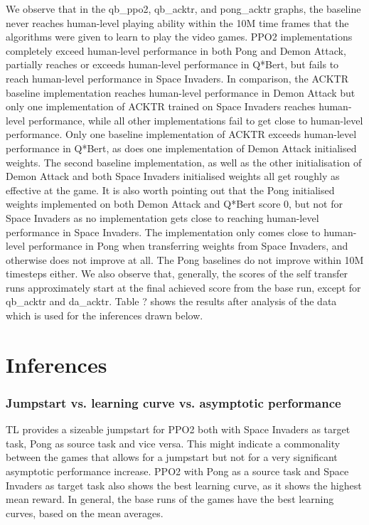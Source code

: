 We observe that in the qb\_ppo2, qb\_acktr, and pong\_acktr graphs, the baseline never reaches human-level playing ability within the 10M time frames that the algorithms were given to learn to play the video games. 
PPO2 implementations completely exceed human-level performance in both Pong and Demon Attack, partially reaches or exceeds human-level performance in Q*Bert, but fails to reach human-level performance in Space Invaders. 
In comparison, the ACKTR baseline implementation reaches human-level performance in Demon Attack but only one implementation of ACKTR trained on Space Invaders reaches human-level performance, while all other implementations fail to get close to human-level performance. Only one baseline implementation of ACKTR exceeds human-level performance in Q*Bert, as does one implementation of Demon Attack initialised weights. The second baseline implementation, as well as the other initialisation of Demon Attack and both Space Invaders initialised weights all get roughly as effective at the game. It is also worth pointing out that the Pong initialised weights implemented on both Demon Attack and Q*Bert score 0, but not for Space Invaders as no implementation gets close to reaching human-level performance in Space Invaders. The implementation only comes close to human-level performance in Pong when transferring weights from Space Invaders, and otherwise does not improve at all. The Pong baselines do not improve within 10M timesteps either.
We also observe that, generally, the scores of the self transfer runs approximately start at the final achieved score from the base run, except for qb\_acktr and da\_acktr.
Table ? shows the results after analysis of the data which is used for the inferences drawn below.

\section{Inferences}
\subsubsection*{Jumpstart vs. learning curve vs. asymptotic performance}
TL provides a sizeable jumpstart for PPO2 both with Space Invaders as target task, Pong as source task and vice versa. This might indicate a commonality between the games that allows for a jumpstart but not for a very significant asymptotic performance increase. PPO2 with Pong as a source task and Space Invaders as target task also shows the best learning curve, as it shows the highest mean reward. In general, the base runs of the games have the best learning curves, based on the mean averages. 

